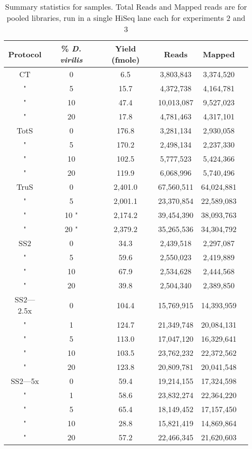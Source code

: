 \begin{table}[htdp]
\begin{center}
\begin{tabular}{|c|c|c|c|c|c|} \hline
Protocol & \% {\em D. virilis}  &  Yield (fmole) & Reads & Mapped \\\hline 
CT & 0  & 6.5  & 3,803,843 &3,374,520 \\
" &  5 & 15.7  & 4,372,738 &4,164,781 \\
" & 10 & 47.4  & 10,013,087 &9,527,023 \\
" & 20 & 17.8  & 4,781,463 &4,317,101 \\
TotS & 0  & 176.8  & 3,281,134 &2,930,058 \\
" &  5  & 170.2  & 2,498,134 &2,237,330 \\
" & 10  & 102.5  & 5,777,523 &5,424,366 \\
" & 20  & 119.9  & 6,068,996 &5,740,496 \\
TruS & 0  & 2,401.0  & 67,560,511 &64,024,881 \\
" &  5  & 2,001.1  & 23,370,854 &22,589,083 \\
" & 10 " & 2,174.2  & 39,454,390 &38,093,763 \\
" & 20 " & 2,379.2  & 35,265,536 &34,304,792 \\
SS2 & 0 & 34.3  & 2,439,518 &2,297,087 \\
" &  5 & 59.6  & 2,550,023 &2,419,889 \\
" & 10 & 67.9  & 2,534,628 &2,444,568 \\
" & 20 & 39.8  & 2,504,340 &2,389,850 \\
SS2---2.5x & 0 & 104.4  & 15,769,915 &14,393,959 \\
" &  1 & 124.7  & 21,349,748 &20,084,131 \\
" &  5 & 113.0  & 17,047,120 &16,329,641 \\
" & 10 & 103.5  & 23,762,232 &22,372,562 \\
" & 20 & 123.8  & 20,809,781 &20,041,548 \\
SS2---5x & 0 & 59.4  & 19,214,155 &17,324,598 \\
" &  1 & 58.6  & 23,832,274 &22,364,220 \\
" &  5 & 65.4  & 18,149,452 &17,157,450 \\
" & 10 & 28.8  & 15,821,419 &14,869,864 \\
" & 20 & 57.2  & 22,466,345 &21,620,603 \\
\hline
\end{tabular}
\label{tab:protocols}
\caption{Summary statistics for samples.  Total Reads
     and Mapped reads are for pooled libraries, run in a single HiSeq lane each
     for experiments 2 and 3}
\end{center}
\end{table}
      
